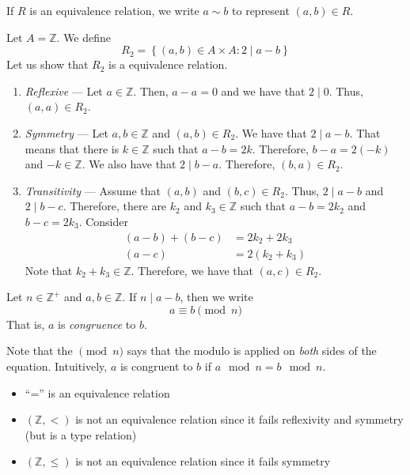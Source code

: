 \begin{remark}
    If \(R\) is an equivalence relation, we write \(a \sim b\) to represent \((a, b) \in R\).
\end{remark}

\begin{nexample}
    Let \(A = \mathbb{Z}\). We define
    \[
        R_2 = \left\{(a, b) \in A \times A : 2 \mid a-b\right\}
    \]
    Let us show that \(R_2\) is a equivalence relation.
    \begin{enumerate}
        \item \textit{Reflexive} --- Let \(a \in \mathbb{Z}\). Then, \(a - a = 0\) and we have that \(2 \mid 0\). Thus, \((a, a) \in R_2\).
        \item \textit{Symmetry} --- Let \(a, b \in \mathbb{Z}\) and \((a, b) \in R_2\). We have that \(2 \mid a-b\). That means that there is \(k \in \mathbb{Z}\) such that \(a - b = 2k\). Therefore, \(b - a = 2(-k)\) and \(-k \in \mathbb{Z}\). We also have that \(2 \mid b-a\). Therefore, \((b, a) \in R_2\).
        \item \textit{Transitivity} --- Assume that \((a, b)\) and \((b, c) \in R_2\). Thus, \(2 \mid a-b\) and \(2 \mid b-c\). Therefore, there are \(k_2\) and \(k_3 \in \mathbb{Z}\) such that \(a-b = 2k_2\) and \(b-c = 2k_3\). Consider
            \[
            \begin{aligned}
                (a - b) + (b - c) &= 2k_2 + 2k_3 \\
                (a - c) &= 2(k_2 + k_3)
            \end{aligned}
            \]
            Note that \(k_2 + k_3 \in \mathbb{Z}\). Therefore, we have that \((a, c) \in R_2\).
    \end{enumerate}
\end{nexample}

\begin{definition}[Congruency]
    Let \(n \in \mathbb{Z}^+\) and \(a, b \in \mathbb{Z}\). If \(n \mid a-b\), then we write
    \[
        a \equiv b \pmod n
    \]
    That is, \(a\) is \textit{congruence} to \(b\).
\end{definition}

\begin{remark}
    Note that the \(\pmod n\) says that the modulo is applied on \textit{both} sides of the equation. Intuitively, \(a\) is congruent to \(b\) if \(a \mod n = b \mod n\).
\end{remark}

\begin{nexample}
    \phantom{wow}

    \begin{itemize}
        \item ``='' is an equivalence relation
        \item \((\mathbb{Z}, <)\) is not an equivalence relation since it fails reflexivity and symmetry (but is a type relation)
        \item \((\mathbb{Z}, \leq)\) is not an equivalence relation since it fails symmetry
    \end{itemize}
\end{nexample}

